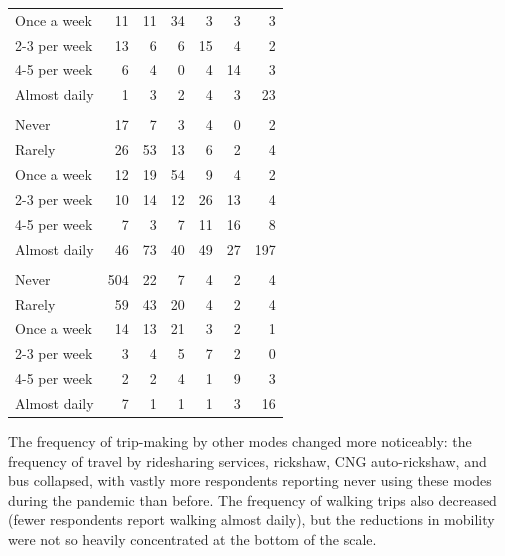 \documentclass[]{elsarticle} %
\begin{document}
\begin{table}[H]
{\begin{tabular}[t]{lrrrrrr}
\hspace{1em}Once a week & 11 & 11 & 34 & 3 & 3 & 3\\
\hspace{1em}2-3 per week & 13 & 6 & 6 & 15 & 4 & 2\\
\hspace{1em}4-5 per week & 6 & 4 & 0 & 4 & 14 & 3\\
\hspace{1em}Almost daily & 1 & 3 & 2 & 4 & 3 & 23\\
\addlinespace[0.3em]
\multicolumn{7}{l}{\textbf{walk}}\\
\hspace{1em}Never & 17 & 7 & 3 & 4 & 0 & 2\\
\hspace{1em}Rarely & 26 & 53 & 13 & 6 & 2 & 4\\
\hspace{1em}Once a week & 12 & 19 & 54 & 9 & 4 & 2\\
\hspace{1em}2-3 per week & 10 & 14 & 12 & 26 & 13 & 4\\
\hspace{1em}4-5 per week & 7 & 3 & 7 & 11 & 16 & 8\\
\hspace{1em}Almost daily & 46 & 73 & 40 & 49 & 27 & 197\\
\addlinespace[0.3em]
\multicolumn{7}{l}{\textbf{bicycle}}\\
\hspace{1em}Never & 504 & 22 & 7 & 4 & 2 & 4\\
\hspace{1em}Rarely & 59 & 43 & 20 & 4 & 2 & 4\\
\hspace{1em}Once a week & 14 & 13 & 21 & 3 & 2 & 1\\
\hspace{1em}2-3 per week & 3 & 4 & 5 & 7 & 2 & 0\\
\hspace{1em}4-5 per week & 2 & 2 & 4 & 1 & 9 & 3\\
\hspace{1em}Almost daily & 7 & 1 & 1 & 1 & 3 & 16\\
\bottomrule
\end{tabular}}
\end{table}

The frequency of trip-making by other modes changed more noticeably: the
frequency of travel by ridesharing services, rickshaw, CNG
auto-rickshaw, and bus collapsed, with vastly more respondents reporting
never using these modes during the pandemic than before. The frequency
of walking trips also decreased (fewer respondents report walking almost
daily), but the reductions in mobility were not so heavily concentrated
at the bottom of the scale.
\end{document}

